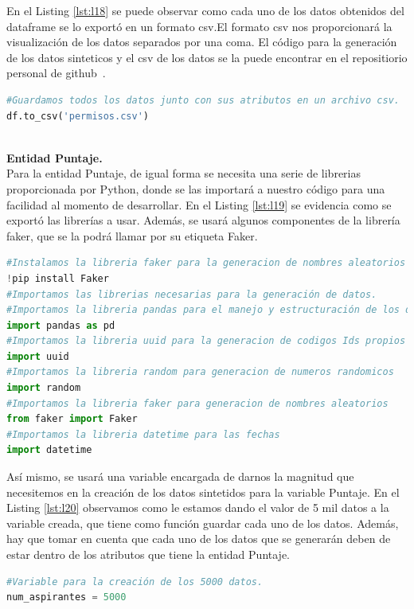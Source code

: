 \documentclass[10pt, oneside,spanish]{article}   	%
\begin{document}
En el Listing \ref{lst:l18} se puede observar como cada uno de los datos obtenidos del dataframe se lo exportó en un formato csv.El formato csv nos proporcionará la visualización de los datos separados por una coma. El código para la generación de los datos sinteticos y el csv de los datos se la puede encontrar en el repositiorio personal de github~\cite{permiso,permisocsv}.
\begin{lstlisting}[language=Python,label={lst:l18},caption=Exportación de los datos a un formato csv de la entidad Permisos,frame=single, ]
#Guardamos todos los datos junto con sus atributos en un archivo csv.
df.to_csv('permisos.csv')
\end{lstlisting}
\\
\textbf{Entidad Puntaje.}
\\
Para la entidad Puntaje, de igual forma se necesita una serie de librerias proporcionada por Python, donde se las importará a nuestro código para una facilidad al momento de desarrollar. En el Listing \ref{lst:l19} se evidencia como se exportó las librerías a usar. Además, se usará algunos componentes de la librería faker, que se la podrá llamar por su etiqueta Faker.
\begin{lstlisting}[language=Python,label={lst:l19},caption=Librerías a utilizar en la entidad Puntaje,frame=single, ]
#Instalamos la libreria faker para la generacion de nombres aleatorios
!pip install Faker
#Importamos las librerias necesarias para la generación de datos.
#Importamos la libreria pandas para el manejo y estructuración de los datos sinteticos
import pandas as pd
#Importamos la libreria uuid para la generacion de codigos Ids propios
import uuid
#Importamos la libreria random para generacion de numeros randomicos
import random
#Importamos la libreria faker para generacion de nombres aleatorios
from faker import Faker
#Importamos la libreria datetime para las fechas
import datetime
\end{lstlisting}
Así mismo, se usará una variable encargada de darnos la magnitud que necesitemos en la creación de los datos sintetidos para la variable Puntaje. En el Listing \ref{lst:l20} observamos como le estamos dando el valor de 5 mil datos a la variable creada, que tiene como función guardar cada uno de los datos. Además, hay que tomar en cuenta que cada uno de los datos que se generarán deben de estar dentro de los atributos que tiene la entidad Puntaje.
\begin{lstlisting}[language=Python,label={lst:l20},caption=Variable para guardar los datos sintéticos,frame=single, ]
#Variable para la creación de los 5000 datos.
num_aspirantes = 5000
\end{lstlisting}
\end{document}
